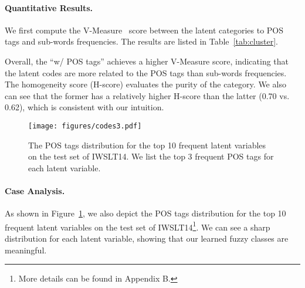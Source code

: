 \paragraph{Quantitative Results.} 
We first compute the V-Measure~\cite{vmeasure} score between the latent categories to POS tags and sub-words frequencies. 
The results are listed in Table~\ref{tab:cluster}.

Overall, the ``w/ POS tags'' achieves a higher V-Measure score, indicating that the latent codes are more related to the POS tags than sub-words frequencies.
The homogeneity score (H-score) evaluates the purity of the category.
We also can see that the former has a relatively higher H-score than the latter (0.70 vs. 0.62),  which is consistent with our intuition.

\begin{figure}[tbp]
\centering
\texttt{[image: figures/codes3.pdf]}
\caption{The POS tags distribution for the top 10 frequent latent variables on the test set of IWSLT14. We list the top 3 frequent POS tags for each latent variable. }
\label{fig:pos_dist}
\end{figure}
\paragraph{Case Analysis.} 
As shown in Figure~\ref{fig:pos_dist}, we also depict the POS tags distribution for the top 10 frequent latent variables on the test set of IWSLT14\footnote{More details can be found in Appendix B.}. 
We can see a sharp distribution for each latent variable, showing that our learned fuzzy classes are meaningful. 


